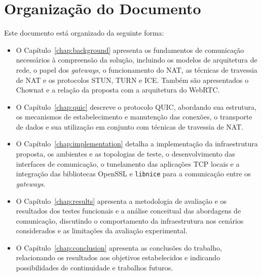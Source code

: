 \section{Organização do Documento}

Este documento está organizado da seguinte forma:

\begin{itemize}

\item O Capítulo~\ref{chap:background} apresenta os fundamentos de comunicação necessários à compreensão da solução, incluindo os modelos de arquitetura de rede, o papel dos \textit{gateways}, o funcionamento do NAT, as técnicas de travessia de NAT e os protocolos STUN, TURN e ICE. Também são apresentados o Chownat e a relação da proposta com a arquitetura do WebRTC.

\item O Capítulo~\ref{chap:quic} descreve o protocolo QUIC, abordando sua estrutura, os mecanismos de estabelecimento e manutenção das conexões, o transporte de dados e sua utilização em conjunto com técnicas de travessia de NAT.

\item O Capítulo~\ref{chap:implementation} detalha a implementação da infraestrutura proposta, os ambientes e as topologias de teste, o desenvolvimento das interfaces de comunicação, o tunelamento das aplicações TCP locais e a integração das bibliotecas OpenSSL e \texttt{libnice} para a comunicação entre os \textit{gateways}.
    
\item O Capítulo~\ref{chap:results} apresenta a metodologia de avaliação e os resultados dos testes funcionais e a análise conceitual das abordagens de comunicação, discutindo o comportamento da infraestrutura nos cenários considerados e as limitações da avaliação experimental.

\item O Capítulo~\ref{chap:conclusion} apresenta as conclusões do trabalho, relacionando os resultados aos objetivos estabelecidos e indicando possibilidades de continuidade e trabalhos futuros.


\end{itemize}

